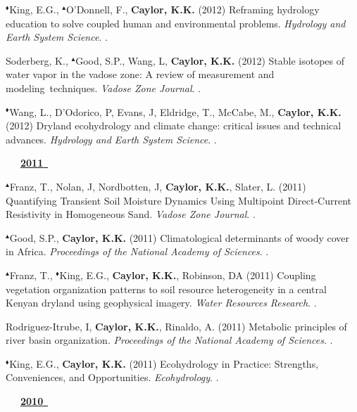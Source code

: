 \begin{etaremune}
\item $^{\blacklozenge}$King, E.G., $^{\blacktriangle}$O'Donnell, F., \textbf{ Caylor, K.K.} (2012) Reframing hydrology education to solve coupled human and environmental problems. \emph{Hydrology and Earth System Science}. .
\item Soderberg, K., $^{\blacktriangle}$Good, S.P., Wang, L, \textbf{ Caylor, K.K.} (2012) Stable isotopes of water vapor in the vadose zone: A review of measurement and modeling techniques. \emph{Vadose Zone Journal}. .
\item $^{\blacklozenge}$Wang, L., D'Odorico, P, Evans, J, Eldridge, T., McCabe, M., \textbf{ Caylor, K.K.} (2012) Dryland ecohydrology and climate change: critical issues and technical advances. \emph{Hydrology and Earth System Science}. .

\vspace{0.1in}
\mbox{\ \ \ \underline{\textbf{2011 }}}
\vspace{0.1in}

\item $^{\blacktriangle}$Franz, T., Nolan, J, Nordbotten, J, \textbf{ Caylor, K.K.}, Slater, L. (2011) Quantifying Transient Soil Moisture Dynamics Using Multipoint Direct-Current Resistivity in Homogeneous Sand. \emph{Vadose Zone Journal}. .
\item $^{\blacktriangle}$Good, S.P., \textbf{ Caylor, K.K.} (2011) Climatological determinants of woody cover in Africa. \emph{Proceedings of the National Academy of Sciences}. .
\item $^{\blacktriangle}$Franz, T., $^{\blacklozenge}$King, E.G., \textbf{ Caylor, K.K.}, Robinson, DA (2011) Coupling vegetation organization patterns to soil resource heterogeneity in a central Kenyan dryland using geophysical imagery. \emph{Water Resources Research}. .
\item Rodriguez-Itrube, I, \textbf{ Caylor, K.K.}, Rinaldo, A. (2011) Metabolic principles of river basin organization. \emph{Proceedings of the National Academy of Sciences}. .
\item $^{\blacklozenge}$King, E.G., \textbf{ Caylor, K.K.} (2011) Ecohydrology in Practice: Strengths, Conveniences, and Opportunities. \emph{Ecohydrology}. .

\vspace{0.1in}
\mbox{\ \ \ \underline{\textbf{2010 }}}
\vspace{0.1in}


\end{etaremune}

